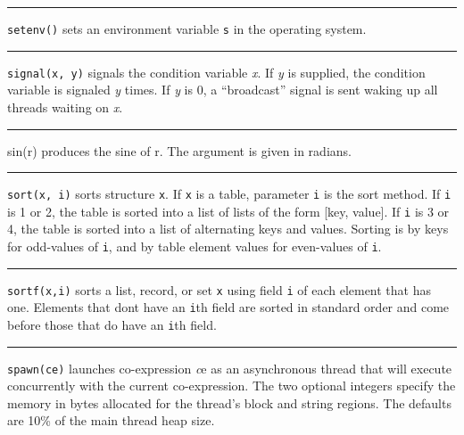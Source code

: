 \bigskip\hrule\vspace{0.1cm}

\noindent
{}\texttt{setenv()} sets an environment variable
\texttt{s} in the operating system.

\bigskip\hrule\vspace{0.1cm}

\noindent
{}\texttt{signal(x, y)} signals the condition variable
{\textit x}. If {\textit y} is supplied, the condition variable is
signaled {\textit y} times. If {\textit y} is 0, a ``broadcast''
signal is sent waking up all threads waiting on {\textit x}.

\bigskip\hrule\vspace{0.1cm}

\noindent
{}sin(r) produces the sine of r. The argument is given in
radians.

\bigskip\hrule\vspace{0.1cm}

\noindent
{}\texttt{sort(x, i)} sorts structure \texttt{x}. If
\texttt{x} is a table, parameter \texttt{i} is the sort method. If
\texttt{i} is 1 or 2, the table is sorted into a list of lists of the
form [key, value]. If \texttt{i} is 3 or 4, the table is sorted into a
list of alternating keys and values. Sorting is by keys for odd-values
of \texttt{i}, and by table element values for even-values of
\texttt{i}.

\bigskip\hrule\vspace{0.1cm}

\noindent
{}\texttt{sortf(x,i)} sorts a list, record, or set
\texttt{x} using field \texttt{i} of each element that has one.
Elements that don{\textquotesingle}t have an
\texttt{i}{\textquotesingle}th field are sorted in standard order and
come before those that do have an \texttt{i}{\textquotesingle}th field.

\bigskip\hrule\vspace{0.1cm}

\noindent
{}\texttt{spawn(ce)} launches co-expression {\textit ce} as an
asynchronous thread that will execute concurrently with the current
co-expression. The two optional integers specify the memory in bytes
allocated for the thread's block and string regions. The defaults are 10\%
of the main thread heap size.

